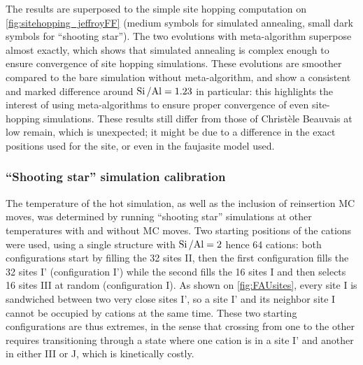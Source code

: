 \documentclass[main.tex]{subfiles}
\begin{document}
The results are superposed to the simple site hopping computation on \cref{fig:sitehopping_jeffroyFF} (medium symbols for simulated annealing, small dark symbols for ``shooting star''). The two evolutions with meta-algorithm superpose almost exactly, which shows that simulated annealing is complex enough to ensure convergence of site hopping simulations. These evolutions are smoother compared to the bare simulation without meta-algorithm, and show a consistent and marked difference around $\mbox{Si\,/Al} = 1.23$ in particular: this highlights the interest of using meta-algorithms to ensure proper convergence of even site-hopping simulations. These results still differ from those of Christèle Beauvais at low \SiAl remain, which is unexpected; it might be due to a difference in the exact positions used for the site, or even in the faujasite model used.

\subsubsection{``Shooting star'' simulation calibration}

The temperature of the hot simulation, as well as the inclusion of reinsertion MC moves, was determined by running ``shooting star'' simulations at other temperatures with and without MC moves. Two starting positions of the cations were used, using a single structure with $\mbox{Si\,/Al} = 2$ hence 64 cations: both configurations start by filling the 32 sites II, then the first configuration fills the 32 sites I' (configuration I') while the second fills the 16 sites I and then selects 16 sites III at random (configuration I). As shown on \cref{fig:FAUsites}, every site I is sandwiched between two very close sites I', so a site I' and its neighbor site I cannot be occupied by cations at the same time. These two starting configurations are thus extremes, in the sense that crossing from one to the other requires transitioning through a state where one cation is in a site I' and another in either III or J, which is kinetically costly.
\end{document}
